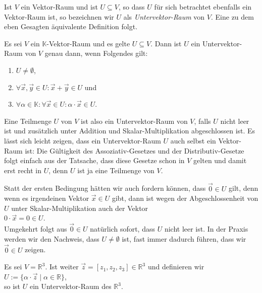 Ist $V$ ein Vektor-Raum und ist $U \subseteq V$, so dass $U$ f\"{u}r sich betrachtet ebenfalls ein
Vektor-Raum ist, so bezeichnen wir $U$ als
\emph{\color{blue}Untervektor-Raum} von $V$.  Eine zu dem eben Gesagten \"{a}quivalente Definition folgt.

\begin{Definition}
Es sei $V$ ein $\mathbb{K}$-Vektor-Raum und es gelte $U \subseteq V$.
Dann ist $U$ ein Untervektor-Raum von $V$ genau dann, 
wenn Folgendes gilt:
\begin{enumerate}
\item $U \not= \emptyset$,
\item $\forall \vec{x}, \vec{y} \in U: \vec{x} + \vec{y} \in U$ \quad und \quad
\item $\forall \alpha \in \mathbb{K}: \forall \vec{x} \in U: \alpha \cdot \vec{x} \in U$.  \eoxs
\end{enumerate}
\end{Definition}

Eine Teilmenge $U$ von $V$ ist also ein Untervektor-Raum von $V$, falls $U$ nicht leer ist und zus\"{a}tzlich
unter Addition und Skalar-Multiplikation abgeschlossen ist.  Es l\"{a}sst sich leicht zeigen, dass ein Untervektor-Raum $U$
auch selbst ein Vektor-Raum ist:  Die G\"{u}ltigkeit des Assoziativ-Gesetzes und der Distributiv-Gesetze folgt einfach aus
der Tatsache, dass diese Gesetze schon in $V$ gelten und damit erst recht in $U$, denn $U$ ist ja eine Teilmenge von
$V$. 

\remark
Statt der ersten Bedingung h\"{a}tten wir auch fordern k\"{o}nnen, dass $\vec{0} \in U$ gilt, denn wenn es
irgendeinen Vektor $\vec{x} \in U$ gibt,  dann ist wegen der Abgeschlossenheit von $U$ unter
Skalar-Multiplikation auch der Vektor
\\[0.2cm]
\hspace*{1.3cm}
$0 \cdot \vec{x} = 0 \in U$.  
\\[0.2cm]
Umgekehrt folgt aus $\vec{0} \in U$ nat\"{u}rlich sofort, dass $U$ nicht leer ist.  In der Praxis werden
wir den Nachweis, dass $U \not= \emptyset$ ist, fast immer dadurch f\"{u}hren, dass wir $\vec{0} \in U$
zeigen. 
\eoxs

\example
Es sei $V = \mathbb{R}^3$.  Ist weiter $\vec{z} = [ z_1, z_2, z_3 ] \in \mathbb{R}^3$ und definieren wir
\\[0.2cm]
\hspace*{1.3cm}
$U := \{ \alpha \cdot \vec{z} \mid \alpha \in \mathbb{R} \}$,
\\[0.2cm]
so ist $U$ ein Untervektor-Raum des $\mathbb{R}^3$.

